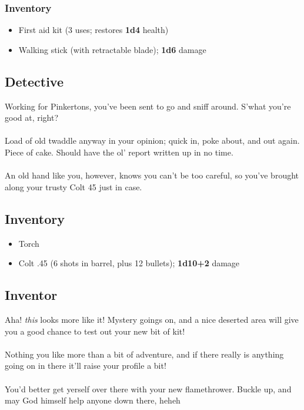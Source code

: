 \documentclass[12pt,a4paper]{article}
\begin{document}
\subsubsection*{Inventory}
\begin{itemize}
\item{First aid kit (3 uses; restores \textbf{1d4} health)}
\item{Walking stick (with retractable blade); \textbf{1d6} damage}
\end{itemize}
\newpage
\subsection*{Detective} %
Working for Pinkertons, you've been sent to go and sniff around.  S'what you're good at, right?\\\\
Load of old twaddle anyway in your opinion; quick in, poke about, and out again.  Piece of cake.  Should have the ol' report written up in no time.\\\\
An old hand like you, however, knows you can't be too careful, so you've brought along your trusty Colt 45 just in case.
\subsection*{Inventory}
\begin{itemize}
\item{Torch}
\item{Colt .45 (6 shots in barrel, plus 12 bullets); \textbf{1d10+2} damage}
\end{itemize}
\newpage
\subsection*{Inventor}
Aha! \textit{this} looks more like it!  Mystery goings on, and a nice deserted area will give you a good chance to test out your new bit of kit!\\\\
Nothing you like more than a bit of adventure, and if there really is anything going on in there it'll raise your profile a bit!\\\\
You'd better get yerself over there with your new flamethrower.  Buckle up, and may God himself help anyone down there, heheh
\end{document}
